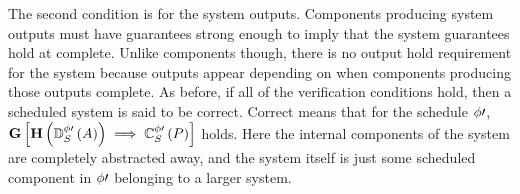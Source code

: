 The second condition is for the system outputs.
Components producing system outputs must have guarantees strong enough to imply that the system guarantees hold at complete.
Unlike components though, there is no output hold requirement for the system because outputs appear depending on when components producing those outputs complete.
As before, if all of the verification conditions hold, then a scheduled system is said to be correct.
Correct means that for the schedule $\phi\prime$, $\mathbf{G}\left[\mathbf{H}\left(\mathbb{D}^{\phi\prime}_S\left(A\right)\right) 
\implies \mathbb{C}^{\phi\prime}_{S}\left(P\right)\right]$ holds.
Here the internal components of the system are completely abstracted away, and the system itself is just some scheduled component in $\phi\prime$ belonging to a larger system.

